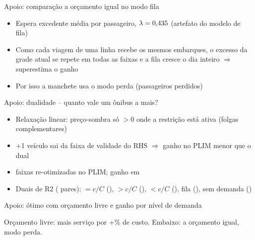\documentclass[aspectratio=169,11pt]{beamer}
\begin{document}
\begin{frame}{Apoio: comparação a orçamento igual no modo fila}
\centering
\resizebox{0.85\linewidth}{!}{}
\vspace{0.8em}
\begin{itemize}\small
\item Espera excedente média por passageiro, $\lambda=0{,}435$ (artefato do modelo de fila)
\item Como cada viagem de uma linha recebe os mesmos embarques, o excesso da grade atual se repete em todas as faixas e a fila cresce o dia inteiro $\Rightarrow$ superestima o ganho
\item Por isso a manchete usa o modo perda (passageiros perdidos)
\end{itemize}
\end{frame}

\begin{frame}{Apoio: dualidade -- quanto vale um ônibus a mais?}
\centering\scriptsize
\resizebox{0.9\linewidth}{!}{}
\vspace{0.5em}
\begin{itemize}\small
\item Relaxação linear: preço-sombra só $>0$ onde a restrição está ativa (folgas complementares)
\item +1 veículo sai da faixa de validade do RHS $\Rightarrow$ ganho no PLIM menor que o dual
\item \faixasReotimizadas{} faixas re-otimizadas no PLIM; ganho em \faixasGanhoPLIM
\item Duais de R2 (\nPares{} pares): $=c/C$ (\regimeFolga), $>c/C$ (\regimeLimite), $<c/C$ (\regimeSobra), fila (\regimeFila), sem demanda (\regimeSemDemanda)
\end{itemize}
\end{frame}

\begin{frame}{Apoio: ótimo com orçamento livre e ganho por nível de demanda}
\centering
\resizebox{0.9\linewidth}{!}{}
\vspace{0.6em}

\resizebox{0.8\linewidth}{!}{}
\vspace{0.4em}

\small Orçamento livre: mais serviço por +\variacaoCusto\% de custo. Embaixo: a orçamento igual, modo perda.
\end{frame}
\end{document}
